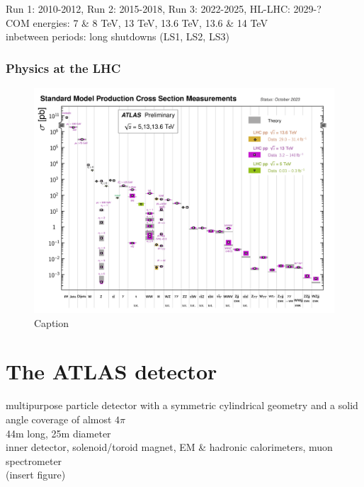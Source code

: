 \documentclass[../thesis.tex]{subfiles}
\begin{document}
Run 1: 2010-2012, Run 2: 2015-2018, Run 3: 2022-2025, HL-LHC: 2029-?\\
COM energies: 7 \& 8 TeV, 13 TeV, 13.6 TeV, 13.6 \& 14 TeV\\


inbetween periods: long shutdowns (LS1, LS2, LS3)\\


\subsubsection*{Physics at the LHC}

\begin{figure}[!htbp]
\begin{center}
\includegraphics[width=\linewidth]{fig/lhc_xsec_Run23.png}
\caption[Caption]{\label{fig:lhc:xsec}Caption \citep{ATL-PHYS-PUB-2023-039}}
\end{center}
\end{figure}


\section{The ATLAS detector}
\label{sec:ATLAS}
multipurpose particle detector with a symmetric cylindrical geometry and a solid angle coverage of almost $4\pi$\\
44m long, 25m diameter\\
inner detector, solenoid/toroid magnet, EM \& hadronic calorimeters, muon spectrometer\\
(insert figure)
\end{document}
